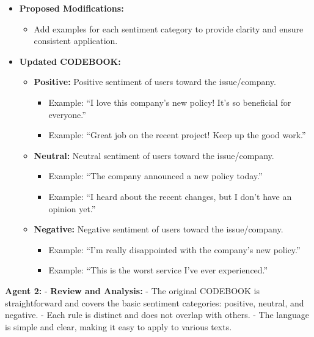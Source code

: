 \begin{itemize}
\tightlist
\item
  \textbf{Proposed Modifications:}

  \begin{itemize}
  \tightlist
  \item
    Add examples for each sentiment category to provide clarity and
    ensure consistent application.
  \end{itemize}
\item
  \textbf{Updated CODEBOOK:}

  \begin{itemize}
  \tightlist
  \item
    \textbf{Positive:} Positive sentiment of users toward the
    issue/company.

    \begin{itemize}
    \tightlist
    \item
      Example: ``I love this company's new policy! It's so beneficial
      for everyone.''
    \item
      Example: ``Great job on the recent project! Keep up the good
      work.''
    \end{itemize}
  \item
    \textbf{Neutral:} Neutral sentiment of users toward the
    issue/company.

    \begin{itemize}
    \tightlist
    \item
      Example: ``The company announced a new policy today.''
    \item
      Example: ``I heard about the recent changes, but I don't have an
      opinion yet.''
    \end{itemize}
  \item
    \textbf{Negative:} Negative sentiment of users toward the
    issue/company.

    \begin{itemize}
    \tightlist
    \item
      Example: ``I'm really disappointed with the company's new
      policy.''
    \item
      Example: ``This is the worst service I've ever experienced.''
    \end{itemize}
  \end{itemize}
\end{itemize}

\textbf{Agent 2:} - \textbf{Review and Analysis:} - The original
CODEBOOK is straightforward and covers the basic sentiment categories:
positive, neutral, and negative. - Each rule is distinct and does not
overlap with others. - The language is simple and clear, making it easy
to apply to various texts.

